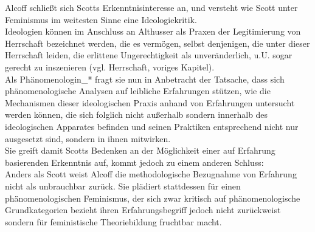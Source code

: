 Alcoff schließt sich Scotts Erkenntnisinteresse an, und versteht
wie Scott unter Feminismus im weitesten Sinne eine Ideologiekritik.\\
Ideologien
können im Anschluss an Althusser als Praxen der Legitimierung von Herrschaft
bezeichnet werden, die es vermögen, selbst denjenigen, die unter dieser
Herrschaft leiden, die erlittene Ungerechtigkeit als unveränderlich, u.U. sogar
gerecht zu inszenieren (vgl. Herrschaft, voriges Kapitel). \\
Als Phänomenologin\_* fragt sie
nun in Anbetracht der Tatsache, dass sich phänomenologische Analysen auf
leibliche Erfahrungen stützen, wie die Mechanismen dieser ideologischen Praxis
anhand von Erfahrungen untersucht werden können, die sich folglich nicht
außerhalb sondern innerhalb des ideologischen Apparates befinden und seinen
Praktiken entsprechend nicht nur ausgesetzt sind, sondern in ihnen mitwirken.\footnotemark{} \\

\noindent Sie greift damit Scotts Bedenken an der Möglichkeit einer auf Erfahrung
basierenden Erkenntnis auf, kommt jedoch zu einem anderen Schluss:\\
Anders als
Scott weist Alcoff die methodologische Bezugnahme von Erfahrung nicht als
unbrauchbar zurück. Sie plädiert stattdessen für einen phänomenologischen
Feminismus, der sich zwar kritisch auf phänomenologische Grundkategorien
bezieht ihren Erfahrungsbegriff jedoch nicht zurückweist sondern für
feministische Theoriebildung fruchtbar macht.\footnotemark{}\\

